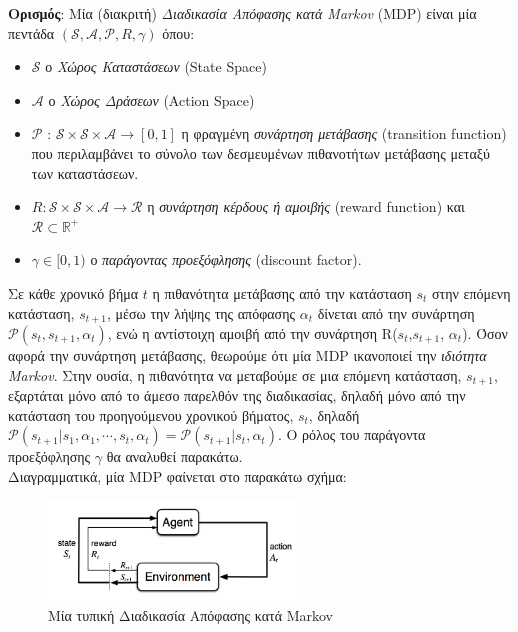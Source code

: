 \documentclass[11pt]{article} %
\numberwithin{equation}{subsection}
\begin{document}
\textbf{Ορισμός}: Μία (διακριτή) \textit{Διαδικασία Απόφασης κατά Markov} (MDP) είναι μία πεντάδα $(\mathcal{S}, \mathcal{A}, \mathcal{P}, R, \gamma)$ όπου:
\begin{itemize}
  \item $\mathcal{S}$ ο \textit{Χώρος Καταστάσεων} (State Space)
  \item $\mathcal{A}$ ο \textit{Χώρος Δράσεων} (Action Space)
  \item $\mathcal{P}$ :  $\mathcal{S} \times  \mathcal{S} \times  \mathcal{A} \rightarrow [0,1]$ η φραγμένη \textit{συνάρτηση μετάβασης} (transition function) που περιλαμβάνει το σύνολο των δεσμευμένων πιθανοτήτων μετάβασης μεταξύ των καταστάσεων.
  \item $R :  \mathcal{S} \times  \mathcal{S} \times  \mathcal{A} \rightarrow  \mathcal{R}$ η \textit{συνάρτηση κέρδους ή αμοιβής} (reward function) και  $\mathcal{R}   \subset \mathbb{R}^+$
  \item $\gamma \in [0,1)$ ο \textit{παράγοντας προεξόφλησης} (discount factor). 
\end{itemize}

Σε κάθε χρονικό βήμα $t$ η πιθανότητα μετάβασης από την κατάσταση $s_t$ στην επόμενη κατάσταση, $s_{t+1}$, μέσω την λήψης της απόφασης $\alpha_t$ δίνεται από την συνάρτηση $\mathcal{P}(s_t, s_{t+1},  \alpha_t)$, ενώ η αντίστοιχη αμοιβή από την συνάρτηση R($s_t$,$s_{t+1}$, $\alpha_t$). Όσον αφορά την συνάρτηση μετάβασης, θεωρούμε ότι μία MDP ικανοποιεί την \textit{ιδιότητα Markov}. Στην ουσία, η πιθανότητα να μεταβούμε σε μια επόμενη κατάσταση, $s_{t+1}$, εξαρτάται μόνο από το άμεσο παρελθόν της διαδικασίας, δηλαδή μόνο από την κατάσταση του προηγούμενου χρονικού βήματος, $s_t$, δηλαδή $\mathcal{P}(s_{t+1}|s_{1},\alpha_{1}, \cdots, s_{t}, \alpha_{t}) = \mathcal{P}(s_{t+1}|s_{t},\alpha_{t})$. Ο ρόλος του παράγοντα προεξόφλησης $\gamma$ θα αναλυθεί παρακάτω.  \\

Διαγραμματικά, μία MDP φαίνεται στο παρακάτω σχήμα:\\
\begin{figure}[h]
    \centering
    \includegraphics[width=0.6\textwidth]{mdp}
    \caption{Μία τυπική Διαδικασία Απόφασης κατά Markov}
    \label{fig:mdp}
\end{figure}
\end{document}

